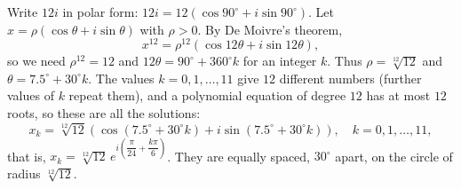 Write $12i$ in polar form: $12i=12\left(\cos90^\circ+i\sin90^\circ\right)$. Let $x=\rho\left(\cos\theta+i\sin\theta\right)$ with $\rho>0$. By De Moivre's theorem,
\[x^{12}=\rho^{12}\left(\cos12\theta+i\sin12\theta\right),\]
so we need $\rho^{12}=12$ and $12\theta=90^\circ+360^\circ k$ for an integer $k$. Thus $\rho=\sqrt[12]{12}$ and $\theta=7.5^\circ+30^\circ k$. The values $k=0,1,\dots,11$ give $12$ different numbers (further values of $k$ repeat them), and a polynomial equation of degree $12$ has at most $12$ roots, so these are all the solutions:
\[\boxed{x_k=\sqrt[12]{12}\left(\cos\left(7.5^\circ+30^\circ k\right)+i\sin\left(7.5^\circ+30^\circ k\right)\right),\quad k=0,1,\dots,11},\]
that is, $x_k=\sqrt[12]{12}\,e^{i\left(\dfrac{\pi}{24}+\dfrac{k\pi}{6}\right)}$. They are equally spaced, $30^\circ$ apart, on the circle of radius $\sqrt[12]{12}$.
